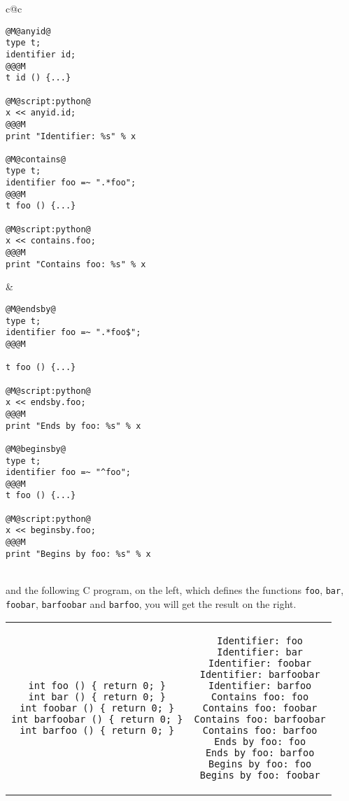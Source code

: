 \begin{tabular}{c@{\hspace{2cm}}c}
\begin{lstlisting}[language=Cocci, name=Regexp]
@M@anyid@
type t;
identifier id;
@@@M
t id () {...}

@M@script:python@
x << anyid.id;
@@@M
print "Identifier: %s" % x

@M@contains@
type t;
identifier foo =~ ".*foo";
@@@M
t foo () {...}

@M@script:python@
x << contains.foo;
@@@M
print "Contains foo: %s" % x

\end{lstlisting}
&
\begin{lstlisting}[language=Cocci,name=Regexp]
@M@endsby@
type t;
identifier foo =~ ".*foo$";
@@@M

t foo () {...}

@M@script:python@
x << endsby.foo;
@@@M
print "Ends by foo: %s" % x

@M@beginsby@
type t;
identifier foo =~ "^foo";
@@@M
t foo () {...}

@M@script:python@
x << beginsby.foo;
@@@M
print "Begins by foo: %s" % x
\end{lstlisting}
\end{tabular}\\

and the following C program, on the left, which defines the functions
\texttt{foo}, \texttt{bar}, \texttt{foobar}, \texttt{barfoobar} and
\texttt{barfoo}, you will get the result on the right.

\begin{tabular}{c@{\hspace{2cm}}c}
\begin{lstlisting}
int foo () { return 0; }
int bar () { return 0; }
int foobar () { return 0; }
int barfoobar () { return 0; }
int barfoo () { return 0; }
\end{lstlisting}
&
\begin{lstlisting}
Identifier: foo
Identifier: bar
Identifier: foobar
Identifier: barfoobar
Identifier: barfoo
Contains foo: foo
Contains foo: foobar
Contains foo: barfoobar
Contains foo: barfoo
Ends by foo: foo
Ends by foo: barfoo
Begins by foo: foo
Begins by foo: foobar
\end{lstlisting}
\end{tabular}

